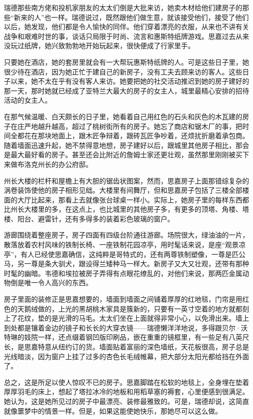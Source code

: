 \par 瑞德那些南方佬和投机家朋友的太太们倒是大批来访，她卖木材给他们建房子的那些“新来的人”也一样。瑞德说过，既然跟他们做生意，就该接受他们，接受了他们以后，她发现，他们都是令人愉快的同伴。他们穿着漂亮的衣服，从来也不讲有关战争和艰难时世的事，谈话只局限于时尚、流言和惠斯特纸牌游戏。思嘉过去从来没玩过纸牌，她兴致勃勃地开始玩起来，很快便成了行家里手。
\par 只要她在酒店，她的套房里就会有一大帮玩惠斯特纸牌的人。可是这些日子里，她很少待在酒店，因为她正忙于建自己的新房子，没有工夫去顾来访的客人。这些日子以来，她不太在乎有没有客人来访。她要把她的社交活动推迟到她的房子建好的那一天，那时她就已经成了亚特兰大最大的房子的女主人，城里最精心安排的招待活动的女主人。
\par 在那气候温暖、白天颇长的日子里，她看着自己用红色的石头和灰色的木瓦建的房子在庄严地越升越高，超过了桃树街所有的房子。她忘了商店和锯木厂的事，把时间全都花在那块地面上，跟木匠争辩着，跟砖瓦匠争吵着，还烦扰折磨着承包商。随着墙面迅速升起，她不禁得意地想，房子建好以后，跟城里其他房子相比，那会是最大最好看的房子。甚至还会比附近的詹姆士家还更壮观，虽然那里刚刚被买下来做布洛克州长的办公府邸。
\par 州长大楼的栏杆和屋檐上有大胆的锯齿状图案，然而，思嘉房子上面那错综复杂的涡卷装饰使他的房子相形见绌。大楼里有间舞厅，但和思嘉房子包括了三楼全部楼面的大厅比起来，那看上去就像张台球桌一样小。实际上，她房子里的每样东西都比州长大楼里的多，在这点上，也比城里的其他房子多，有更多的顶塔、角楼、塔楼、阳台、避雷针，还有多得多的装着彩色玻璃的窗户。
\par 游廊围绕着整座房子，房子四面有四级台阶通往游廊。场院很大，绿油油的一片，散落放着农村风味的铁制长椅、一座铁制花园凉亭，用时髦话来说，是座“观景凉亭”，有人已经使思嘉确信，这纯粹是哥特式的，还有两尊铁制塑像，一尊是匹公马，另一尊是条大驯犬，跟设得兰矮种马一样大。新房子又大又壮观，还带有那种时髦的幽暗。韦德和埃拉被房子弄得有点眼花缭乱的，对他们来说，那两匹金属动物倒是唯一令人高兴的东西。
\par 房子里面的装修正是思嘉想要的，墙面到墙面之间铺着厚厚的红地毯，门帘是用红色的天鹅绒做的，上光的黑胡桃木家具是簇新的，只要有一英寸空着的地方就都刻上了花纹，垫的是光滑的马毛。太太们坐在上面就得非常小心，以免滑出来。墙上到处都是镶着金边的镜子和长长的大穿衣镜——瑞德懒洋洋地说，多得跟贝尔·沃特琳的妓院一样，还点缀着钢凹版印刷品，嵌在重重的镜框里，有一些足有八英尺长，是思嘉特意从纽约订的货。墙面贴着富丽的深色墙纸，天花板很高，房子总是光线暗淡，因为窗户上挂了过多的杏色长毛绒帷幕，把大部分太阳光都给挡在外面了。
\par 总之，这是所足以使人惊叹不已的房子。思嘉脚踏在松软的地毯上，全身埋在垫着厚厚羽毛的床上，想起了塔拉冰冷的地板和用稻草塞的褥套，心里便感到很满足。她认为，这是她所见过的房子中最漂亮、装修最雅致的。可是，瑞德却说，这简直就像噩梦中的情景一样。但是，如果这能使她快乐，那她尽可以这么做。

